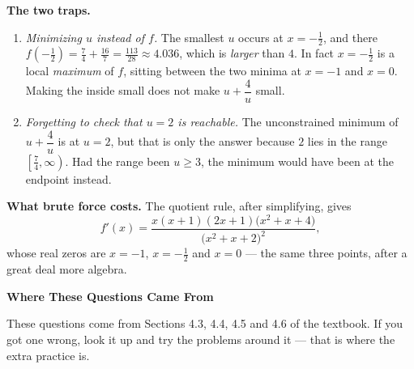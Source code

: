 \documentclass[11pt]{article}
\begin{document}
\medskip
\noindent\textbf{The two traps.}
\begin{enumerate}[label=\textbf{(\arabic*)},leftmargin=2.6em,itemsep=4pt,topsep=4pt]
  \item \emph{Minimizing $u$ instead of $f$.} The smallest $u$ occurs at
  $x=-\tfrac{1}{2}$, and there
  $f\!\left(-\tfrac{1}{2}\right)=\tfrac{7}{4}+\tfrac{16}{7}=\tfrac{113}{28}\approx4.036$,
  which is \emph{larger} than $4$. In fact $x=-\tfrac{1}{2}$ is a local \emph{maximum} of
  $f$, sitting between the two minima at $x=-1$ and $x=0$. Making the inside small does
  not make $u+\dfrac{4}{u}$ small.
  \item \emph{Forgetting to check that $u=2$ is reachable.} The unconstrained minimum of
  $u+\dfrac{4}{u}$ is at $u=2$, but that is only the answer because $2$ lies in the range
  $\left[\tfrac{7}{4},\infty\right)$. Had the range been $u\ge3$, the minimum would have
  been at the endpoint instead.
\end{enumerate}

\medskip
\noindent\textbf{What brute force costs.} The quotient rule, after simplifying, gives
\[
  f'(x)=\frac{x(x+1)(2x+1)\bigl(x^{2}+x+4\bigr)}{\bigl(x^{2}+x+2\bigr)^{2}},
\]
whose real zeros are $x=-1$, $x=-\tfrac{1}{2}$ and $x=0$ --- the same three points, after
a great deal more algebra.

\clearpage
\begin{center}\Large\textbf{Where These Questions Came From}\end{center}
\medskip

\noindent These questions come from Sections 4.3, 4.4, 4.5 and 4.6 of the textbook. If you
got one wrong, look it up and try the problems around it --- that is where the extra
practice is.
\medskip
\end{document}
